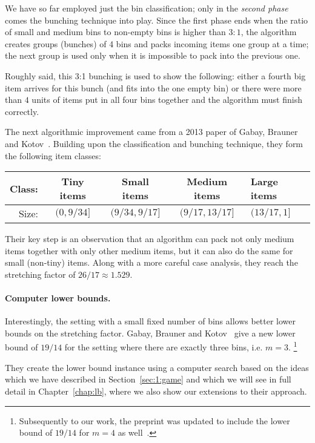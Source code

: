 We have so far employed just the bin classification; only in the
\emph{second phase} comes the bunching technique into play. Since the
first phase ends when the ratio of small and medium bins to non-empty
bins is higher than $3:1$, the algorithm creates groups (bunches) of 4
bins and packs incoming items one group at a time; the next group is
used only when it is impossible to pack into the previous one.

Roughly said, this 3:1 bunching is used to show the following: either
a fourth big item arrives for this bunch (and fits into the one empty
bin) or there were more than $4$ units of items put in all four bins
together and the algorithm must finish correctly.

\smallskip

The next algorithmic improvement came from a 2013 paper of Gabay,
Brauner and Kotov~\cite{gabay2013}. Building upon the classification
and bunching technique, they form the following item classes:

\begin{center}
  \begin{tabular}{ r | c | c | c | l }
    Class: & Tiny items & Small items & Medium items & Large items \\ \hline
    Size: & $(0,9/34]$  & $(9/34, 9/17]$ & $(9/17, 13/17]$  & $(13/17,1]$  
  \end{tabular}
\end{center}

Their key step is an observation that an algorithm can pack not only
medium items together with only other medium items, but it can also do
the same for small (non-tiny) items. Along with a more careful case
analysis, they reach the stretching factor of $26/17 \approx 1.529$.

\paragraph{Computer lower bounds.} Interestingly, the setting with a
small fixed number of bins allows better lower bounds on the
stretching factor. Gabay, Brauner and Kotov~\cite{gabay2013lbv2} give
a new lower bound of $19/14$ for the setting where there are exactly
three bins, i.e. $m=3$. \footnote{Subsequently to our work, the
preprint \cite{gabay2013lbv2} was updated to include the lower bound
of $19/14$ for $m=4$ as well~\cite{gabay2015lbv3}.}

They create the lower bound instance using a computer search based on
the ideas which we have described in Section~\ref{sec:1:game} and which we will see
in full detail in Chapter~\ref{chap:lb}, where we also show our extensions to
their approach.

